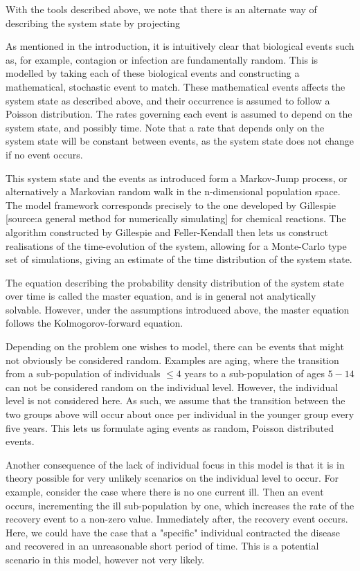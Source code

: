 \documentclass[10pt,a4paper]{article}
\begin{document}
With the tools described above, we note that there is an alternate way of describing the system state by projecting 


As mentioned in the introduction, it is intuitively clear that biological events such as, for example, contagion or infection are fundamentally random. This is modelled by taking each of these biological events and constructing a mathematical, stochastic event to match. These mathematical events affects the system state as described above, and their occurrence is assumed to follow a Poisson distribution. The rates governing each event is assumed to depend on the system state, and possibly time. Note that a rate that depends only on the system state will be constant between events, as the system state does not change if no event occurs.

This system state and the events as introduced form a Markov-Jump process, or alternatively a Markovian random walk in the n-dimensional population space. The model framework corresponds precisely to the one developed by Gillespie [source:a general method for numerically simulating] for chemical reactions. The algorithm constructed by Gillespie and Feller-Kendall then lets us construct realisations of the time-evolution of the system, allowing for a Monte-Carlo type set of simulations, giving an estimate of the time distribution of the system state.

The equation describing the probability density distribution of the system state over time is called the master equation, and is in general not analytically solvable. However, under the assumptions introduced above, the master equation follows the Kolmogorov-forward equation.

Depending on the problem one wishes to model, there can be events that might not obviously be considered random. Examples are aging, where the transition from a sub-population of individuals $\leq 4$ years to a sub-population of ages $5-14$ can not be considered random on the individual level. However, the individual level is not considered here. As such, we assume that the transition between the two groups above will occur about once per individual in the younger group every five years. This lets us formulate aging events as random, Poisson distributed events.

Another consequence of the lack of individual focus in this model is that it is in theory possible for very unlikely scenarios on the individual level to occur. For example, consider the case where there is no one current ill. Then an event occurs, incrementing the ill sub-population by one, which increases the rate of the recovery event to a non-zero value. Immediately after, the recovery event occurs. Here, we could have the case that a "specific" individual contracted the disease and recovered in an unreasonable short period of time. This is a potential scenario in this model, however not very likely.
\end{document}
